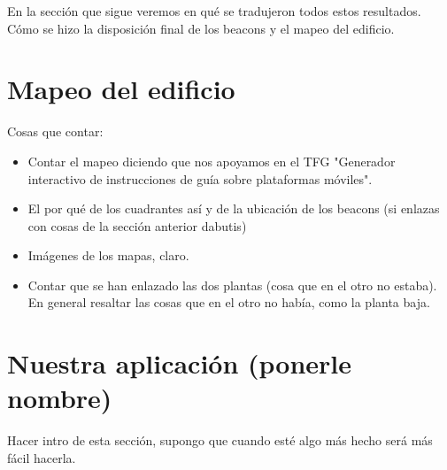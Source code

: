 En la sección que sigue veremos en qué se tradujeron todos estos resultados. Cómo se hizo la disposición final de los beacons y el mapeo del edificio.


\section{Mapeo del edificio}

Cosas que contar:

\begin{itemize}
	\item Contar el mapeo diciendo que nos apoyamos en el TFG "Generador interactivo de instrucciones
	de guía sobre plataformas móviles".
	\item El por qué de los cuadrantes así y de la ubicación de los beacons (si enlazas con cosas de la sección anterior dabutis)
	\item Imágenes de los mapas, claro.
	\item Contar que se han enlazado las dos plantas (cosa que en el otro no estaba). En general resaltar las cosas que en el otro no había, como la planta baja.
\end{itemize}

\section{Nuestra aplicación (ponerle nombre)}

Hacer intro de esta sección, supongo que cuando esté algo más hecho será más fácil hacerla.

